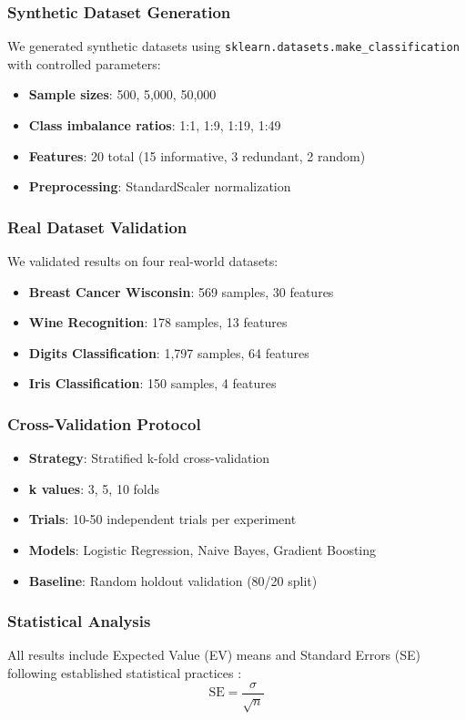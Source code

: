 \documentclass[twoside,11pt]{article}
\begin{document}
\subsubsection{Synthetic Dataset Generation}
We generated synthetic datasets using \texttt{sklearn.datasets.make\_classification} with controlled parameters:
\begin{itemize}
    \item \textbf{Sample sizes}: 500, 5,000, 50,000
    \item \textbf{Class imbalance ratios}: 1:1, 1:9, 1:19, 1:49
    \item \textbf{Features}: 20 total (15 informative, 3 redundant, 2 random)
    \item \textbf{Preprocessing}: StandardScaler normalization
\end{itemize}

\subsubsection{Real Dataset Validation}
We validated results on four real-world datasets:
\begin{itemize}
    \item \textbf{Breast Cancer Wisconsin}: 569 samples, 30 features
    \item \textbf{Wine Recognition}: 178 samples, 13 features
    \item \textbf{Digits Classification}: 1,797 samples, 64 features
    \item \textbf{Iris Classification}: 150 samples, 4 features
\end{itemize}

\subsubsection{Cross-Validation Protocol}
\begin{itemize}
    \item \textbf{Strategy}: Stratified k-fold cross-validation
    \item \textbf{k values}: 3, 5, 10 folds
    \item \textbf{Trials}: 10-50 independent trials per experiment
    \item \textbf{Models}: Logistic Regression, Naive Bayes, Gradient Boosting
    \item \textbf{Baseline}: Random holdout validation (80/20 split)
\end{itemize}

\subsubsection{Statistical Analysis}
All results include Expected Value (EV) means and Standard Errors (SE) following established statistical practices \citep{cohen1988statistical}:
\begin{equation}
\text{SE} = \frac{\sigma}{\sqrt{n}}
\end{equation}
\end{document}

